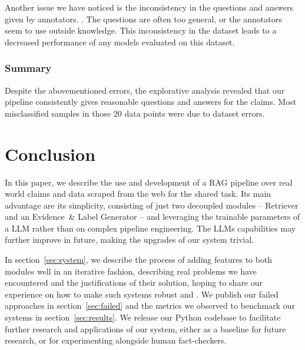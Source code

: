 Another issue we have noticed is the inconsistency in the questions and answers given by annotators. . The questions are often too general, or the annotators seem to use outside knowledge. This inconsistency in the dataset leads to a decreased performance of any models evaluated on this dataset.

\subsubsection{Summary}
Despite the abovementioned errors, the explorative analysis revealed that our pipeline consistently gives reasonable questions and answers for the claims. Most misclassified samples in those 20 data points were due to dataset errors.


\section{Conclusion}
\label{sec:conclusion}
In this paper, we describe the use and development of a RAG pipeline over real world claims and data scraped from the web for the \averitec{} shared task.
Its main advantage are its simplicity, consisting of just two decoupled modules -- Retriever and an Evidence~\& Label Generator -- and leveraging the trainable parameters of a LLM rather than on complex pipeline engineering.
The LLMs capabilities may further improve in future, making the upgrades of our system trivial.

In section~\ref{sec:system}, we describe the process of adding features to both modules well in an iterative fashion, describing real problems we have encountered and the justifications of their solution, hoping to share our experience on how to make such systems robust and .
We publish our failed approaches in section~\ref{sec:failed} and the metrics we observed to benchmark our systems in section~\ref{sec:results}. 
We release our Python codebase to facilitate further research and applications of our system, either as a baseline for future research, or for experimenting alongside human fact-checkers.

